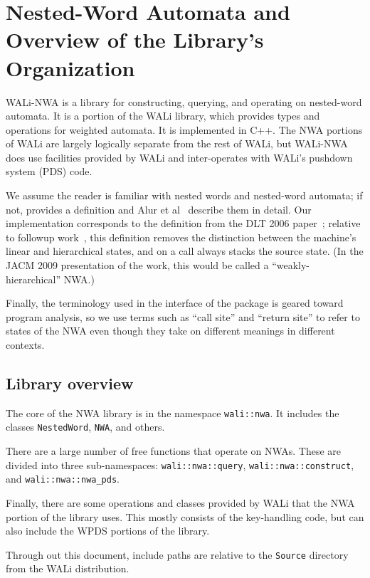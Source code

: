 \section{Nested-Word Automata and Overview of the Library's Organization}
\label{Se:Nested Word Automata}

WALi-NWA is a library for constructing, querying, and operating on
nested-word automata.  It is a portion of the WALi library, which provides
types and operations for weighted automata.
It is implemented in C++.  The NWA portions of WALi
are largely logically separate from the rest of WALi, but WALi-NWA does use
facilities provided by WALi and inter-operates with WALi's pushdown system
(PDS) code.

We assume the reader is familiar with nested words and
nested-word automata; if not,  provides a definition and
Alur et al~\cite{DLT:AM2006,JACM:AM2009} describe them in detail. Our
implementation corresponds to the definition from the DLT 2006
paper~\cite{DLT:AM2006}; relative to followup work~\cite{JACM:AM2009}, this definition removes
the distinction between the machine's linear and hierarchical states, and on
a call always stacks the source state. (In the JACM 2009 presentation of the
work, this would be called a ``weakly-hierarchical'' NWA.)

Finally, the terminology used in the interface of the package is geared
toward program analysis, so we use terms such as ``call site'' and ``return
site'' to refer to states of the NWA even though they take on different
meanings in different contexts.


\subsection{Library overview}

The core of the NWA library is in the namespace \texttt{wali::nwa}. It
includes the classes \texttt{NestedWord}, \texttt{NWA}, and others.

There are a large number of free functions that operate on NWAs. These
are divided into three sub-namespaces:
\texttt{wali::nwa::query}, \texttt{wali::nwa::construct}, and
\texttt{wali::nwa::nwa\_pds}.

Finally, there are some operations and classes provided by WALi that the NWA
portion of the library uses. This mostly consists of the key-handling code,
but can also include the WPDS portions of the library.

Through out this document, include paths are relative to the \texttt{Source}
directory from the WALi distribution.

